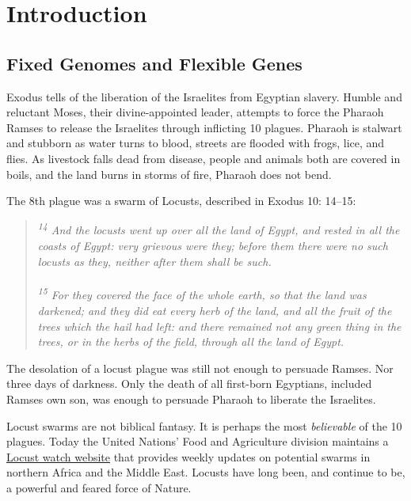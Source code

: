 \chapter{Introduction}  \label{Intro} 
\section{Fixed Genomes and Flexible Genes}\label{Intro:sec:Fixed Genomes and Flexible Genes} 

  Exodus tells of the liberation of the Israelites from Egyptian slavery. Humble and reluctant Moses, their divine-appointed leader, attempts to force the Pharaoh Ramses to release the Israelites through inflicting 10 plagues. Pharaoh is stalwart and stubborn as water turns to blood, streets are flooded with frogs, lice, and flies. As livestock falls dead from disease, people and animals both are covered in boils, and the land burns in storms of fire, Pharaoh does not bend.

  The 8th plague was a swarm of Locusts, described in Exodus 10: 14–15:

  \begin{quote}
    \itshape
    \singlespacing
    \textsuperscript{14} And the locusts went up over all the land of Egypt, and rested in all the coasts of Egypt: very grievous were they; before them there were no such locusts as they, neither after them shall be such.\\ 
      \\
    \textsuperscript{15} For they covered the face of the whole earth, so that the land was darkened; and they did eat every herb of the land, and all the fruit of the trees which the hail had left: and there remained not any green thing in the trees, or in the herbs of the field, through all the land of Egypt.
    \end{quote}

  The desolation of a locust plague was still not enough to persuade Ramses. Nor three days of darkness. Only the death of all first-born Egyptians, included Ramses own son, was enough to persuade Pharaoh to liberate the Israelites.

  Locust swarms are not biblical fantasy. It is perhaps the most \textit{believable} of the 10 plagues. Today the United Nations' Food and Agriculture division maintains a \href{http://www.fao.org/ag/locusts/en/info/info/news/index.html}{Locust watch website} that provides weekly updates on potential swarms in northern Africa and the Middle East. Locusts have long been, and continue to be, a powerful and feared force of Nature.

